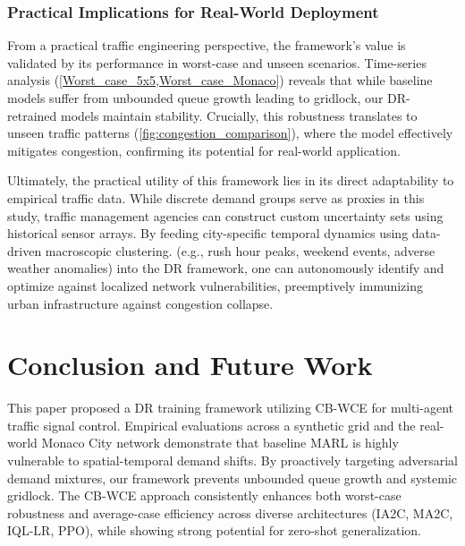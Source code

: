 \documentclass[lettersize,journal]{IEEEtran}
\begin{document}
\subsubsection{Practical Implications for Real-World Deployment}

From a practical traffic engineering perspective, the framework's value is validated by its performance in worst-case and unseen scenarios. Time-series analysis (\cref{Worst_case_5x5,Worst_case_Monaco}) reveals that while baseline models suffer from unbounded queue growth leading to gridlock, our DR-retrained models maintain stability. Crucially, this robustness translates to unseen traffic patterns (\cref{fig:congestion_comparison}), where the model effectively mitigates congestion, confirming its potential for real-world application.

Ultimately, the practical utility of this framework lies in its direct adaptability to empirical traffic data. While discrete demand groups serve as proxies in this study, traffic management agencies can construct custom uncertainty sets using historical sensor arrays. By feeding city-specific temporal dynamics using data-driven macroscopic clustering. (e.g., rush hour peaks, weekend events, adverse weather anomalies) into the DR framework, one can autonomously identify and optimize against localized network vulnerabilities, preemptively immunizing urban infrastructure against congestion collapse.


\section{Conclusion and Future Work}
\label{sec:conclusion}

This paper proposed a DR training framework utilizing CB-WCE for multi-agent traffic signal control. Empirical evaluations across a synthetic grid and the real-world Monaco City network demonstrate that baseline MARL is highly vulnerable to spatial-temporal demand shifts. By proactively targeting adversarial demand mixtures, our framework prevents unbounded queue growth and systemic gridlock. The CB-WCE approach consistently enhances both worst-case robustness and average-case efficiency across diverse architectures (IA2C, MA2C, IQL-LR, PPO), while showing strong potential for zero-shot generalization. 
\end{document}
